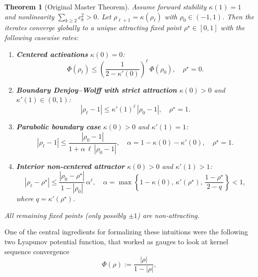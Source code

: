 \documentclass[11pt]{article}
\newtheorem{theorem}{Theorem}
\begin{document}
\begin{theorem}[Original Master Theorem]
Assume forward stability $\kappa(1)=1$ and nonlinearity $\sum_{k\geq2} c_k^2>0$. Let 
$\rho_{\ell+1}=\kappa(\rho_\ell)$ 
with $\rho_0\in(-1,1)$. Then the iterates converge globally to a unique attracting fixed point $\rho^\star\in[0,1]$ with the following casewise rates:

\begin{enumerate}
\item \textbf{Centered activations} $\kappa(0)=0$:
\begin{equation}
\Phi(\rho_\ell) \leq \left(\frac{1}{2-\kappa'(0)}\right)^{\ell}\, \Phi(\rho_0), \quad \rho^\star=0.
\end{equation}

\item \textbf{Boundary Denjoy–Wolff with strict attraction} $\kappa(0)>0$ and $\kappa'(1)\in(0,1)$:
\begin{equation}
|\rho_\ell-1| \leq \kappa'(1)^{\ell}\,|\rho_0-1|, \quad \rho^\star=1.
\end{equation}

\item \textbf{Parabolic boundary case} $\kappa(0)>0$ and $\kappa'(1)=1$:
\begin{equation}
|\rho_\ell-1| \leq \frac{|\rho_0-1|}{1+\alpha\,\ell\,|\rho_0-1|}, \quad \alpha = 1-\kappa(0)-\kappa'(0), \quad \rho^\star=1.
\end{equation}

\item \textbf{Interior non-centered attractor} $\kappa(0)>0$ and $\kappa'(1)>1$:
\begin{equation}
|\rho_\ell-\rho^\star| \leq \frac{|\rho_0-\rho^\star|}{1-|\rho_0|}\, \alpha^{\ell}, \quad
\alpha = \max\left\{1-\kappa(0),\, \kappa'(\rho^\star),\, \frac{1-\rho^\star}{2-q}\right\} < 1,
\end{equation}
where $q=\kappa'(\rho^\star)$.
\end{enumerate}

All remaining fixed points (only possibly $\pm1$) are non-attracting.
\end{theorem}

One of the central ingredients for formalizing these intuitions were the following two Lyapunov potential function, that worked as gauges to look at kernel sequence convergence
\begin{equation}
\Phi(\rho) := \frac{|\rho|}{1-|\rho|},
\end{equation}
\end{document}
